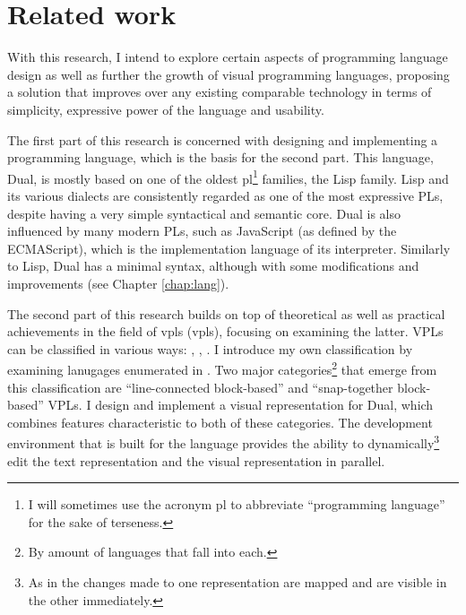 \section{Related work}
With this research, I intend to explore certain aspects of programming language design as well as further the growth of visual programming languages, proposing a solution that improves over any existing comparable technology in terms of simplicity, expressive power of the language and usability.

The first part of this research is concerned with designing and implementing a programming language, which is  the basis for the second part. This language, Dual, is mostly based on one of the oldest \acrshort{pl}\footnote{I will sometimes use the acronym \acrshort{pl} to abbreviate ``programming language'' for the sake of terseness.} families, the Lisp\cite{lisp_draft}\cite{lisp_wikipedia} family. Lisp and its various dialects are consistently regarded as one of the most expressive PLs\cite{lisp_expressive, lisp_powerful}, despite having a very simple syntactical  and semantic core\cite{lisp_simple}. Dual is also influenced by many modern PLs, such as JavaScript (as defined by the ECMAScript\cite{ecmascript}), which is the implementation language of its interpreter. Similarly to Lisp, Dual has a minimal syntax, although with some modifications and improvements (see Chapter \ref{chap:lang}). 

The second part of this research builds on top of theoretical\cite{visual_languages} as well as practical\cite{snapshots} achievements in the field of \acrlong{vpl}s (\acrshort{vpl}s), focusing on examining the latter. VPLs can be classified in various ways: \cite[Section~VPL-II.B]{visual_languages}, \cite[Section~Types~of~VPLs]{vpl_maturity}, \cite[Section~Definition]{vpl_wikipedia}. I introduce my own classification by examining lanugages enumerated in \cite{snapshots}. Two major categories\footnote{By amount of languages that fall into each.} that emerge from this classification are ``line-connected block-based'' and ``snap-together block-based'' VPLs. I design and implement a visual representation for Dual, which combines features characteristic to both of these categories. The development environment that is built for the language provides the ability to dynamically\footnote{As in the changes made to one representation are mapped and are visible in the other immediately.} edit the text representation and the visual representation in parallel.

